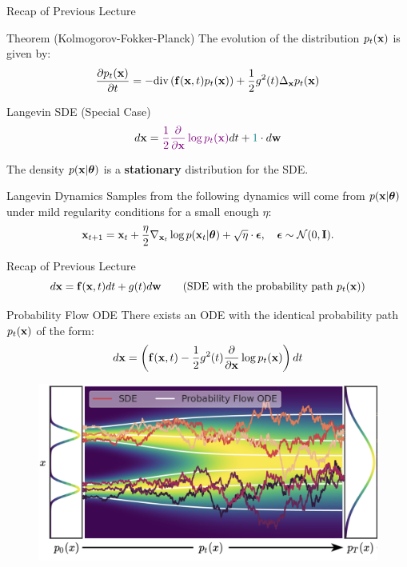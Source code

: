 \documentclass{beamer}
\begin{document}
\begin{frame}{Recap of Previous Lecture}
 	\begin{block}{Theorem (Kolmogorov-Fokker-Planck)}
 		The evolution of the distribution $p_t(\mathbf{x})$ is given by:
 		\vspace{-0.3cm}
 		\[
 			\frac{\partial p_t(\mathbf{x})}{\partial t} = - \text{div}\left(\mathbf{f}(\mathbf{x}, t) p_t(\mathbf{x})\right) + \frac{1}{2}g^2(t) \Delta_{\mathbf{x}}p_t(\mathbf{x})
 		\]
 		\vspace{-0.5cm}
 	\end{block}
 	\begin{block}{Langevin SDE (Special Case)}
 		\vspace{-0.3cm}
 		\[
 			d \mathbf{x} = {\color{violet}\frac{1}{2} \frac{\partial}{\partial \mathbf{x}} \log p_t(\mathbf{x})} d t + {\color{teal} 1 } \cdot d \mathbf{w}
 		\]
 		\vspace{-0.3cm}
 	\end{block}
 	The density $p(\mathbf{x} | \boldsymbol{\theta})$ is a \textbf{stationary} distribution for the SDE.
	\begin{block}{Langevin Dynamics}
		Samples from the following dynamics will come from $p(\mathbf{x} | \boldsymbol{\theta})$ under mild regularity conditions for a small enough $\eta$:
		\vspace{-0.2cm}
		\[
			\mathbf{x}_{t + 1} = \mathbf{x}_t + \frac{\eta}{2} \nabla_{\mathbf{x}_t} \log p(\mathbf{x}_t | \boldsymbol{\theta}) + \sqrt{\eta} \cdot \boldsymbol{\epsilon}, \quad \boldsymbol{\epsilon} \sim \mathcal{N}(0, \mathbf{I}).
		\]
	\end{block}
\end{frame}
\begin{frame}{Recap of Previous Lecture}
	\vspace{-0.3cm}
	\[
		d\mathbf{x} = \mathbf{f}(\mathbf{x}, t) dt + g(t) d \mathbf{w} \qquad \text{(SDE with the probability path $p_t(\mathbf{x})$)}
	\]
	\vspace{-0.7cm}
	\begin{block}{Probability Flow ODE}
		There exists an ODE with the identical probability path $p_t(\mathbf{x})$ of the form:
		\vspace{-0.3cm}
		\[
			d\mathbf{x} = \left(\mathbf{f}(\mathbf{x}, t) -\frac{1}{2} g^2(t) \frac{\partial}{\partial \mathbf{x}} \log p_t(\mathbf{x}) \right) dt
		\]
		\vspace{-0.7cm}
	\end{block}
	\begin{figure}
		\includegraphics[width=0.75\linewidth]{figs/probability_flow}
	\end{figure}
\end{frame}
\end{document}
